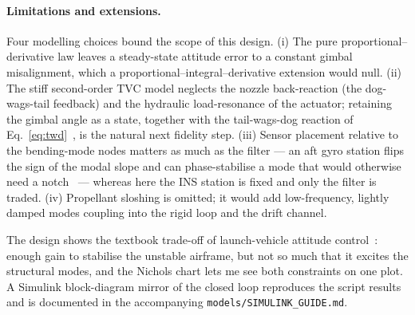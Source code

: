 \documentclass[../main.tex]{subfiles}
\begin{document}
\paragraph{Limitations and extensions.} Four modelling choices bound the scope
of this design. (i) The pure proportional--derivative law leaves a
steady-state attitude error to a constant gimbal misalignment, which a
proportional--integral--derivative extension would null. (ii) The stiff
second-order TVC model neglects the nozzle back-reaction (the dog-wags-tail
feedback) and the hydraulic load-resonance of the actuator;
retaining the gimbal angle as a state, together with the tail-wags-dog reaction of
Eq.~\eqref{eq:twd}~\cite[Lecture~20]{dclvnotes}, is the natural next fidelity
step. (iii) Sensor placement relative to the bending-mode nodes matters as much
as the filter --- an aft gyro station flips the
sign of the modal slope and can phase-stabilise a mode that would otherwise need
a notch~\cite[Sec.~3.3.2.2]{greensite_cr826} --- whereas here the INS station is
fixed and only the filter is traded. (iv) Propellant sloshing is omitted; it
would add low-frequency, lightly damped modes coupling into the rigid loop and
the drift channel.

The design shows the textbook trade-off of launch-vehicle attitude
control~\cite[Lecture~18]{dclvnotes}: enough gain to stabilise the
unstable airframe, but not so much that it excites the structural modes, and the
Nichols chart lets me see both constraints on one plot. A Simulink
block-diagram mirror of the closed loop reproduces the script results and is
documented in the accompanying \texttt{models/SIMULINK\_GUIDE.md}.
\end{document}
